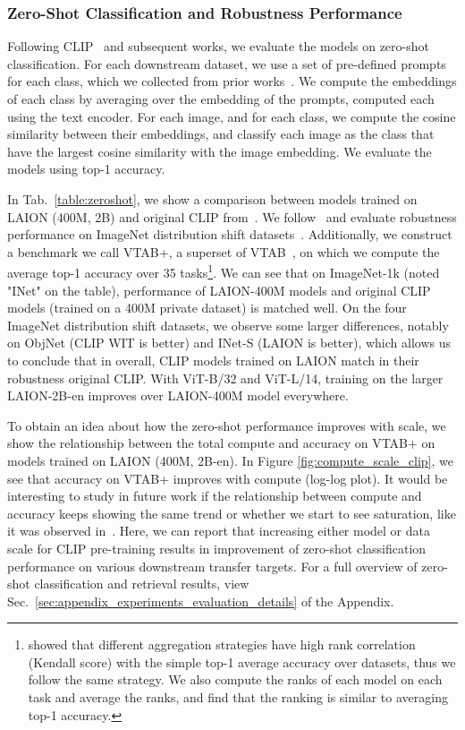 \subsubsection{Zero-Shot Classification and Robustness Performance}

Following CLIP~\cite{radford2021learning} and subsequent works, we evaluate the models on zero-shot classification. For each downstream dataset, we use a set of pre-defined prompts for each class, which we collected from prior works~\cite{radford2021learning,zhai2021lit}. We compute the embeddings of each class by averaging over the embedding of the prompts, computed each using the text encoder. For each image, and for each class, we compute the cosine similarity between their embeddings, and classify each image as the class that have the largest cosine similarity with the image embedding. We evaluate the models using top-1 accuracy.

In Tab.~\ref{table:zeroshot}, we show a comparison between models trained on LAION (400M, 2B) and original CLIP from~\cite{radford2021learning}. We follow~\cite{zhai2021lit} and evaluate robustness performance on ImageNet distribution shift datasets~\cite{pmlr-v97-recht19a, imagenetr, imagenetsketch, imageneta, objectnet}. Additionally, we construct a benchmark we call VTAB+, a superset of VTAB~\cite{zhai2019large}, on which we compute the average top-1 accuracy over 35 tasks\footnote{\cite{zhai2019large} showed that different aggregation strategies have high rank correlation (Kendall score) with the simple top-1 average accuracy over datasets, thus we follow the same strategy. We also compute the ranks of each model on each task and average the ranks, and find that the ranking is similar to averaging top-1 accuracy.}. We can see that on ImageNet-1k (noted "INet" on the table), performance of LAION-400M models and original CLIP models (trained on a 400M private dataset) is matched well. On the four ImageNet distribution shift datasets, we observe some larger differences, notably on ObjNet (CLIP WIT is better) and INet-S (LAION is better), which allows us to conclude that in overall, CLIP models trained on LAION match in their robustness original CLIP.  With ViT-B/32 and ViT-L/14, training on the larger LAION-2B-en improves over LAION-400M model everywhere. 

To obtain an idea about how the zero-shot performance improves with scale, we show the relationship between the total compute and accuracy on VTAB+ on models trained on LAION (400M, 2B-en). In Figure \ref{fig:compute_scale_clip}, we  see that accuracy on VTAB+ improves with compute (log-log plot). It would be interesting to study in future work if the relationship between compute and accuracy keeps showing the same trend or whether we start to see saturation, like it was observed in~\cite{zhai2021scaling}. Here, we can report that increasing either model or data scale for CLIP pre-training results in improvement of zero-shot classification performance on various downstream transfer targets. For a full overview of zero-shot classification and retrieval results, view Sec.~\ref{sec:appendix_experiments_evaluation_details} of the Appendix.

